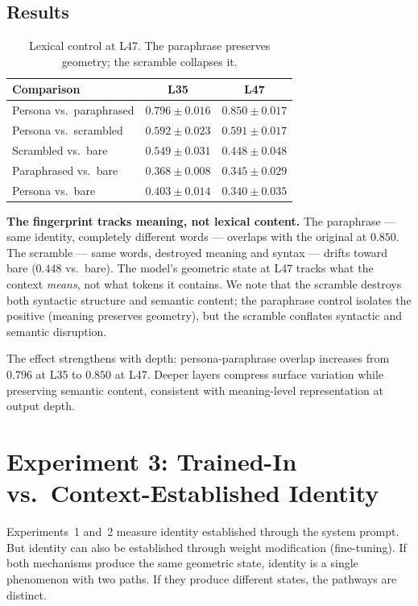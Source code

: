 \documentclass[11pt,a4paper]{article}
\begin{document}
\subsection{Results}

\begin{table}[H]
\centering
\caption{Lexical control at L47. The paraphrase preserves geometry;
the scramble collapses it.}
\label{tab:lexical}
\begin{tabular}{lcc}
\toprule
Comparison & L35 & L47 \\
\midrule
Persona vs.\ paraphrased & $0.796 \pm 0.016$ & $\mathbf{0.850 \pm 0.017}$ \\
Persona vs.\ scrambled & $0.592 \pm 0.023$ & $0.591 \pm 0.017$ \\
Scrambled vs.\ bare & $0.549 \pm 0.031$ & $0.448 \pm 0.048$ \\
Paraphrased vs.\ bare & $0.368 \pm 0.008$ & $0.345 \pm 0.029$ \\
Persona vs.\ bare & $0.403 \pm 0.014$ & $0.340 \pm 0.035$ \\
\bottomrule
\end{tabular}
\end{table}

\textbf{The fingerprint tracks meaning, not lexical content.} The
paraphrase --- same identity, completely different words --- overlaps with
the original at $0.850$. The scramble --- same words, destroyed meaning
and syntax --- drifts toward bare ($0.448$ vs.\ bare). The model's
geometric state at L47 tracks what the context \emph{means}, not what
tokens it contains. We note that the scramble destroys both syntactic
structure and semantic content; the paraphrase control isolates the
positive (meaning preserves geometry), but the scramble conflates
syntactic and semantic disruption.

The effect strengthens with depth: persona-paraphrase overlap increases
from $0.796$ at L35 to $0.850$ at L47. Deeper layers compress surface
variation while preserving semantic content, consistent with meaning-level
representation at output depth.

\section{Experiment 3: Trained-In vs.\ Context-Established Identity}
\label{sec:lora}

Experiments~1 and~2 measure identity established through the system
prompt. But identity can also be established through weight modification
(fine-tuning). If both mechanisms produce the same geometric state,
identity is a single phenomenon with two paths. If they produce different
states, the pathways are distinct.
\end{document}
